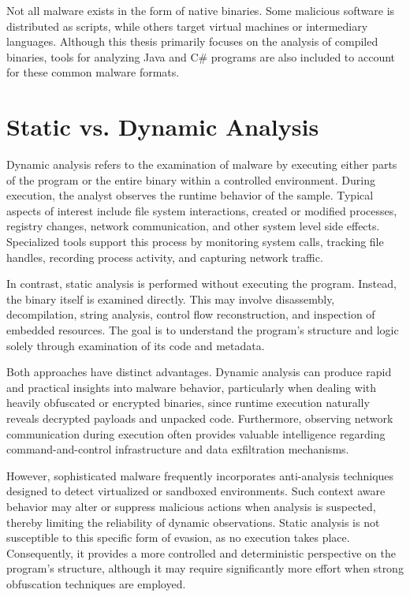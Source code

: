Not all malware exists in the form of native binaries. Some malicious software is distributed as scripts, while others target virtual machines or intermediary languages. 
Although this thesis primarily focuses on the analysis of compiled binaries, tools for analyzing Java and C\# programs are also included to account 
for these common malware formats.

\section{Static vs. Dynamic Analysis}
\label{sec:background:staticVsDynamic}

Dynamic analysis refers to the examination of malware by executing either parts of the program or the entire binary within a controlled environment. 
During execution, the analyst observes the runtime behavior of the sample. Typical aspects of interest include file system interactions, created or modified processes, 
registry changes, network communication, and other system level side effects. Specialized tools support this process by monitoring system calls, tracking file handles, 
recording process activity, and capturing network traffic.

In contrast, static analysis is performed without executing the program. Instead, the binary itself is examined directly. This may involve disassembly, decompilation, string analysis, 
control flow reconstruction, and inspection of embedded resources. The goal is to understand the program's structure and logic solely through examination of its code and metadata.

Both approaches have distinct advantages. Dynamic analysis can produce rapid and practical insights into malware behavior, particularly when dealing with heavily obfuscated or encrypted binaries, 
since runtime execution naturally reveals decrypted payloads and unpacked code. Furthermore, observing network communication during execution often provides valuable intelligence regarding 
command-and-control infrastructure and data exfiltration mechanisms.

However, sophisticated malware frequently incorporates anti-analysis techniques designed to detect virtualized or sandboxed environments. Such context aware behavior may alter or suppress malicious 
actions when analysis is suspected, thereby limiting the reliability of dynamic observations. Static analysis is not susceptible to this specific form of evasion, as no execution takes place. 
Consequently, it provides a more controlled and deterministic perspective on the program's structure, although it may require significantly more effort when strong obfuscation techniques are employed.


